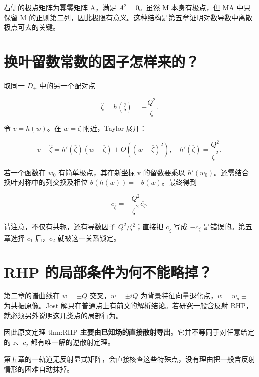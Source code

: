 右侧的极点矩阵为幂零矩阵 A，满足 $A^{2}=0$。虽然 M 本身有极点，但 MA 中只保留 M 的正则第二列，因此极限有意义。这种结构是第五章证明对数导数中离散极点可去的关键。\par

\section{换叶留数常数的因子怎样来的？}
\par

取同一 $D_{+}$ 中的另一个配对点\par

\[
\widehat\zeta=h(\overline\zeta)
=-\dfrac{Q^2}{\overline\zeta}.
\]

令 $v=h(w)$。在 $w=\overline\zeta{}$ 附近，Taylor 展开：\par

\[
v-\widehat\zeta
=h'(\overline\zeta)(w-\overline\zeta)
+O((w-\overline\zeta)^2),
\quad
h'(\overline\zeta)=\dfrac{Q^2}{\overline\zeta^{\,2}}.
\]

若一个函数在 $w_{0}$ 有简单极点，其在新坐标 v 的留数要乘以 $h'(w_{0})$。还需结合换叶对称中的列交换及相位 $\theta{}(h(w))=-\theta{}(w)$。最终得到\par

\[
\boxed{
c_{\widehat\zeta}
=-\dfrac{Q^2}{\overline\zeta^{\,2}}\overline{c_\zeta}.
}
\]

请注意，不仅有共轭，还有导数因子 $Q^{2}/\overline\zeta{}^{2}$；直接把 $c_{\hat \zeta{}}$ 写成 $-\bar c_\zeta{}$ 是错误的。第五章选择 $c_{1}$ 后，$c_{2}$ 就被这一关系锁定。\par

\section{RHP 的局部条件为何不能略掉？}

第二章的谱曲线在 $w=\pm{}Q$ 交叉，$w=\pm{}iQ$ 为背景特征向量退化点，$w=w_{a}\pm{}$ 为共振原像。Jost 解只在普通点上有前文的解析结论。若研究一般含反射 RHP，就必须另外说明这几类点的局部行为。\par

因此原文定理 thm:RHP \textbf{主要由已知场的直接散射导出}。它并不等同于对任意给定的 r、$c_{j}$ 都有唯一解的逆散射定理。\par

第五章的一轨道无反射显式矩阵，会直接核查这些特殊点，没有理由把一般含反射情形的困难自动抹掉。\par

